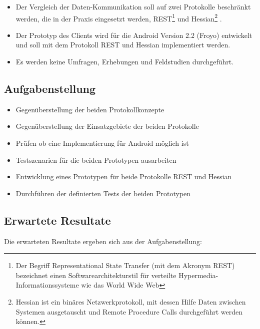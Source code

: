 \documentclass[listof=totocnumbered, bibliography=totocnumbered]{scrreprt}
\begin{document}
  \begin{itemize}
      \item Der Vergleich der Daten-Kommunikation soll auf zwei Protokolle
          beschränkt werden, die in der Praxis eingesetzt werden,
          REST\footnote{
              Der Begriff Representational State Transfer (mit dem Akronym
              REST) bezeichnet einen Softwarearchitekturstil für verteilte
              Hypermedia-Informationssysteme wie das World Wide Web}
          und Hessian\footnote{
              Hessian ist ein binäres Netzwerkprotokoll, mit dessen Hilfe
              Daten zwischen Systemen ausgetauscht und Remote Procedure Calls
              durchgeführt werden können.}
          .
      \item Der Prototyp des Clients wird für die Android Version 2.2 (Froyo)
          entwickelt und soll mit dem Protokoll REST und Hessian
          implementiert werden.
      \item Es werden keine Umfragen, Erhebungen und Feldstudien
          durchgeführt.
  \end{itemize}
  
  \newpage
  
  \subsection{Aufgabenstellung}
  
  \begin{itemize}
      \item Gegenüberstellung der beiden Protokollkonzepte
      \item Gegenüberstellung der Einsatzgebiete der beiden Protokolle
      \item Prüfen ob eine Implementierung für Android möglich ist
      \item Testszenarien für die beiden Prototypen ausarbeiten
      \item Entwicklung eines Prototypen für beide Protokolle REST und
          Hessian
      \item Durchführen der definierten Tests der beiden Prototypen
  \end{itemize}
  
  \subsection{Erwartete Resultate}
  Die erwarteten Resultate ergeben sich aus der Aufgabenstellung:
  
\end{document}
